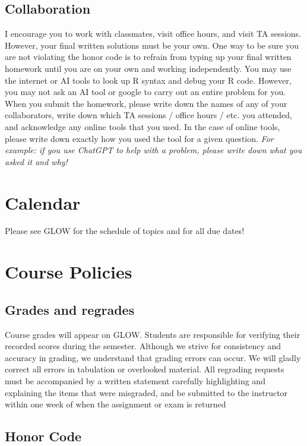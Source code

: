 \documentclass[11pt]{article}
\begin{document}
\subsection{Collaboration}

I encourage you to work with classmates, visit office hours, and visit TA sessions. However, your final written solutions must be your own. One way to be sure you are not violating the honor code is to refrain from typing up your final written homework until you are on your own and working independently. You may use the internet or AI tools to look up R syntax and debug your R code. However, you may not ask an AI tool or google to carry out an entire problem for you. When you submit the homework, please write down the names of any of your collaborators, write down which TA sessions / office hours / etc. you attended, and acknowledge any online tools that you used. In the case of online tools, please write down exactly how you used the tool for a given question. \emph{For example: if you use ChatGPT to help with a problem, please write down what you asked it and why!}  

 
\section{Calendar}

Please see GLOW for the schedule of topics and for all due dates! 

\section{Course Policies}

\subsection{Grades and regrades}

Course grades will appear on GLOW. Students are responsible for verifying their recorded scores during the semester. Although we strive for consistency and accuracy in grading, we understand that grading errors can occur. We will gladly correct all errors in tabulation or overlooked material. All regrading requests must be accompanied by a written statement carefully highlighting and
explaining the items that were misgraded, and be submitted to the instructor within one week of when the assignment or exam is returned

\subsection{Honor Code}
\end{document}

